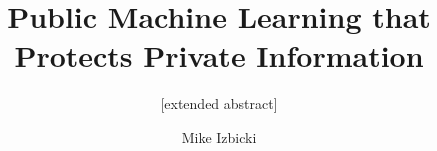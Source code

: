 \documentclass{icopust}
\begin{document}
\title{Public Machine Learning that Protects Private Information}
\subtitle{[extended abstract]}

%
%
%
%
%

%
\author{
%
%
\alignauthor
Mike Izbicki\\
       \\
       \\
       \\
}
\end{document}
